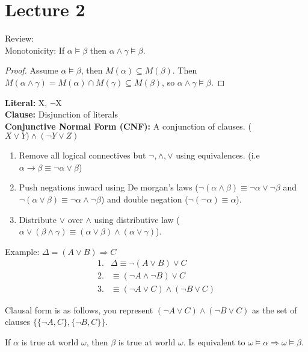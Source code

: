 \documentclass[11pt]{article}
\begin{document}
\section{Lecture 2}

Review:\\
Monotonicity: If $\alpha \models \beta$ then $\alpha \land \gamma \models \beta$.

\begin{proof}
    Assume $\alpha \models \beta$, then $M(\alpha) \subseteq M(\beta)$. Then $M(\alpha \land \gamma) = M(\alpha) \cap M(\gamma) \subseteq M(\beta)$, so $\alpha \land \gamma \models \beta$.
\end{proof}
\vspace{1em}

\textbf{Literal:}  X, $\neg$X\\
\textbf{Clause:} Disjunction of literals\\
\textbf{Conjunctive Normal Form (CNF):} A conjunction of clauses. ($X \lor Y) \land (\neg Y \lor Z)$\\
\begin{enumerate}
    \item Remove all logical connectives but $\neg, \land, \lor$ using equivalences. (i.e $\alpha \rightarrow \beta \equiv \neg \alpha \lor \beta$)
    \item Push negations inward using De morgan's laws ($\neg(\alpha \land \beta) \equiv \neg \alpha \lor \neg \beta$ and $\neg(\alpha \lor \beta) \equiv \neg \alpha \land \neg \beta$) and double negation ($\neg(\neg \alpha) \equiv \alpha$).
    \item Distribute $\lor$ over $\land$ using distributive law ($\alpha \lor (\beta \land \gamma) \equiv (\alpha \lor \beta) \land (\alpha \lor \gamma)$).
\end{enumerate}
Example: $\Delta = (A \lor B) \Rightarrow C$
\begin{align*}
1. & \Delta \equiv \neg(A \lor B) \lor C\\
2. & \equiv (\neg A \land \neg B) \lor C\\
3. & \equiv (\neg A \lor C) \land (\neg B \lor C)
\end{align*}
\vspace{1em}

Clausal form is as follows, you represent $(\neg A \lor C) \land (\neg B \lor C)$ as the set of clauses $\{\{\neg A, C\}, \{\neg B, C\}\}$.
\vspace{1em}

If $\alpha$ is true at world $\omega$, then $\beta$ is true at world $\omega$. Is equivalent to $\omega \models \alpha \Rightarrow \omega \models \beta$.
\end{document}
